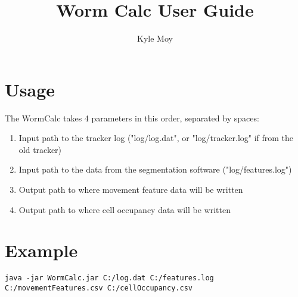 \documentclass[]{article}
\title{Worm Calc User Guide}
\author{Kyle Moy}
\begin{document}
\maketitle

\section{Usage}
The WormCalc takes 4 parameters in this order, separated by spaces:

\begin{enumerate}
	\item Input path to the tracker log ("log/log.dat", or "log/tracker.log" if from the old tracker)
	\item Input path to the data from the segmentation software ("log/features.log")
	\item Output path to where movement feature data will be written
	\item Output path to where cell occupancy data will be written
\end{enumerate}

\section{Example}
\begin{lstlisting}[language=command.com, breaklines=true, caption=Arbitrary Input Output Paths]
java -jar WormCalc.jar C:/log.dat C:/features.log C:/movementFeatures.csv C:/cellOccupancy.csv
\end{lstlisting}
\end{document}
